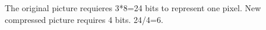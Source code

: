 \begin{answer}
The original picture requieres 3*8=24 bits to represent one pixel. New compressed picture requires 4 bits. 24/4=6.
\end{answer}
